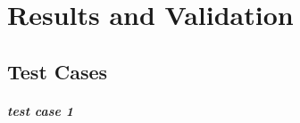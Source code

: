 \newpage

\chapter{Results and Validation}
\lipsum[1]

\section{Test Cases}\label{test cases}
\paragraph*{test case 1} 
\lipsum[2]
